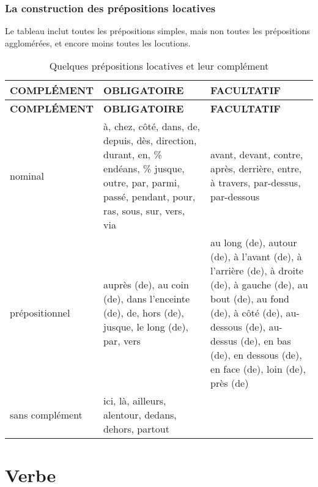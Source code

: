 \documentclass[UTF8]{report}
\begin{document}
\subsection{La construction des prépositions locatives}
Le tableau inclut toutes les prépositions simples, mais non toutes les prépositions agglomérées, et encore moins toutes les locutions.
\begin{table}[H]
    \centering
    \begin{longtable}{|m{2.5cm}|m{6cm}|m{6cm}|}
    \hline
    \rowcolor{cyan!20}
    \textbf{COMPLÉMENT} & \textbf{OBLIGATOIRE} & \textbf{FACULTATIF} \\
    \hline
    \endfirsthead
    \hline
    \rowcolor{cyan!20}
    \textbf{COMPLÉMENT} & \textbf{OBLIGATOIRE} & \textbf{FACULTATIF} \\
    \hline
    \endhead
    \hline
    \endfoot
    \hline
    \endlastfoot
    
    nominal & à, chez, côté, dans, de, depuis, dès, direction, durant, en, \% endéans, \% jusque, outre, par, parmi, passé, pendant, pour, ras, sous, sur, vers, via & avant, devant, contre, après, derrière, entre, à travers, par-dessus, par-dessous \\
    \hline
    prépositionnel & auprès (de), au coin (de), dans l'enceinte (de), de, hors (de), jusque, le long (de), par, vers & au long (de), autour (de), à l'avant (de), à l'arrière (de), à droite (de), à gauche (de), au bout (de), au fond (de), à côté (de), au-dessous (de), au-dessus (de), en bas (de), en dessous (de), en face (de), loin (de), près (de) \\
    \hline
    sans complément & ici, là, ailleurs, alentour, dedans, dehors, partout & \\
    \hline
    \end{longtable}
    \caption{Quelques prépositions locatives et leur complément}
    \label{tab:pc}
\end{table}

\chapter{Verbe}
\end{document}

